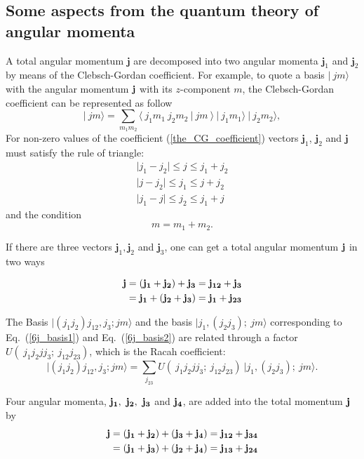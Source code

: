 \documentclass[12pt,a4paper,twoside]{article}
\begin{document}
\subsection{Some aspects from the quantum theory of angular momenta}
A total angular momentum $\mathbf{j}$ are decomposed into two angular momenta $\mathbf{j}_1$ and $\mathbf{j}_2$ by means of the Clebsch-Gordan coefficient. For example, to quote a basis $\vert ~ jm \rangle $ with the angular momentum $\bf j$ with its $z$-component $m$, the Clebsch-Gordan coefficient can be represented as follow
\begin{equation}
\label{the_CG_coefficient}
\vert ~ jm \rangle =\sum_{m_1 m_2} \langle ~ j_1 m_1~j_2 m_2~ \vert ~j m~  \rangle ~ \vert ~j_1 m_1 \rangle~ \vert ~j_2 m_2 \rangle,
\end{equation}
For non-zero values of the coefficient (\ref{the_CG_coefficient}) vectors $\mathbf{j}_1$, $\mathbf{j}_2$ and $\mathbf{j}$ must satisfy the rule of triangle:
\begin{align*}
\vert j_1 - j_2 \vert \leq j \leq j_1 + j_2 \\
\vert j - j_2 \vert \leq j_1 \leq j + j_2 \\ 
\vert j_1 - j \vert \leq j_2 \leq j_1 + j 
\end{align*}
and the condition
\begin{equation*}
m=m_1+m_2.
\end{equation*}


If there are three vectors $\mathbf{j}_1, \mathbf{j}_2$ and $\mathbf{j}_3$, one can get a total angular momentum $\bf j$ in two ways

\begin{align}
\label{6j_basis1}
\bf j & =\bf \left( j_1 + j_2 \right) + j_3 = j_{12} + j_3 \\
\label{6j_basis2}		
& = \bf j_1 + \left( j_2  + j_3 \right) = j_1 +j_{23}
\end{align}

The Basis $ \vert (j_1 j_2)j_{12},j_3; jm \rangle$ and the basis $\vert j_1,(j_2 j_3); ~jm \rangle$ corresponding to Eq.~(\ref{6j_basis1}) and Eq.~(\ref{6j_basis2}) are related through a factor $U(~j_1 j_2 j j_3;~ j_{12} j_{23})$, which is the Racah coefficient:
\begin{equation}
\vert (j_1 j_2)j_{12},j_3; jm \rangle = \sum_{j_{23}} U(~j_1 j_2 j j_3;~ j_{12} j_{23}) ~ \vert j_1,(j_2 j_3); ~jm \rangle.
\end{equation}

Four angular momenta, $\bf j_1,~j_2,~j_3$ and $\bf j_4$, are added into the total momentum $\bf j$ by
\begin{align}
\label{9j_basis1}
\bf j & =\bf \left( j_1 + j_2 \right) + ( j_3 + j_4) = j_{12} + j_{34} \\
\label{9j_basis2}		
& = \bf ( j_1 + j_3 ) + \left( j_2  + j_4 \right) = j_{13} +j_{24}
\end{align}
\end{document}
